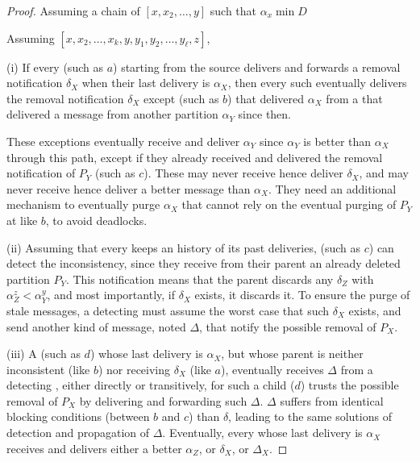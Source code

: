 \begin{proof}
  Assuming a chain of \processes $[x, x_2, \ldots, y]$ such that
  $\alpha_x \min D$

  
  Assuming $[x, x_2, \ldots, x_k, y, y_1, y_2, \ldots, y_\ell, z]$, 
  
  (i) If every \process (such as $a$) starting from the source
  delivers and forwards a removal notification $\delta_X$ when their
  last delivery is $\alpha_X$, then every such \process eventually
  delivers the removal notification $\delta_X$ except \processes (such
  as $b$) that delivered $\alpha_X$ from a \process that delivered a
  message from another partition $\alpha_Y$ since then.
  
  These exceptions eventually receive and deliver $\alpha_Y$ since
  $\alpha_Y$ is better than $\alpha_X$ through this path, except if
  they already received and delivered the removal notification of
  $P_Y$ (such as $c$). These \processes may never receive hence
  deliver $\delta_X$, and may never receive hence deliver a better
  message than $\alpha_X$. They need an additional mechanism to
  eventually purge $\alpha_X$ that cannot rely on the eventual purging
  of $P_Y$ at \processes like $b$, to avoid deadlocks.
  
  (ii) Assuming that every \process keeps an history of its past
  deliveries, \processes (such as $c$) can detect the inconsistency,
  since they receive from their parent an already deleted partition
  $P_Y$. This notification means that the parent discards any
  $\delta_Z$ with $\alpha_Z^z < \alpha_Y^y$, and most importantly, if
  $\delta_X$ exists, it discards it. To ensure the purge of stale
  messages, a detecting \process must assume the worst case that such
  $\delta_X$ exists, and send another kind of message, noted $\Delta$,
  that notify the possible removal of $P_X$.
  
  (iii) A \process (such as $d$) whose last delivery is $\alpha_X$,
  but whose parent is neither inconsistent (like $b$) nor receiving
  $\delta_X$ (like $a$), eventually receives $\Delta$ from a detecting
  \process, either directly or transitively, for such a child \process
  ($d$) trusts the possible removal of $P_X$ by delivering and
  forwarding such $\Delta$. $\Delta$ suffers from identical blocking
  conditions (between $b$ and $c$) than $\delta$, leading to the same
  solutions of detection and propagation of $\Delta$. Eventually,
  every \process whose last delivery is $\alpha_X$ receives and
  delivers either a better $\alpha_Z$, or $\delta_X$, or $\Delta_X$.
\end{proof}

